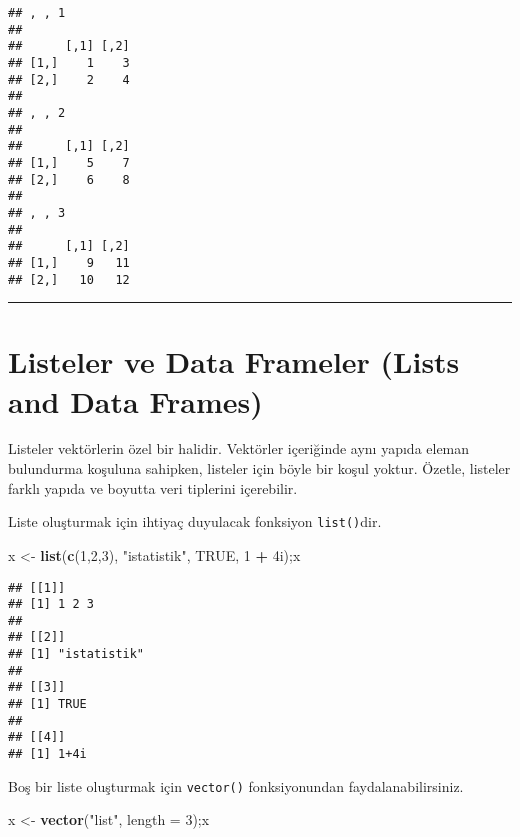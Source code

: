 \documentclass[
]{book}
\newenvironment{Shaded}{\begin{snugshade}}{\end{snugshade}}
\newcommand{\DataTypeTok}[1]{\textcolor[rgb]{0.13,0.29,0.53}{#1}}
\newcommand{\DecValTok}[1]{\textcolor[rgb]{0.00,0.00,0.81}{#1}}
\newcommand{\KeywordTok}[1]{\textcolor[rgb]{0.13,0.29,0.53}{\textbf{#1}}}
\newcommand{\NormalTok}[1]{#1}
\newcommand{\OperatorTok}[1]{\textcolor[rgb]{0.81,0.36,0.00}{\textbf{#1}}}
\newcommand{\OtherTok}[1]{\textcolor[rgb]{0.56,0.35,0.01}{#1}}
\newcommand{\StringTok}[1]{\textcolor[rgb]{0.31,0.60,0.02}{#1}}
\begin{document}
\begin{verbatim}
## , , 1
##
##      [,1] [,2]
## [1,]    1    3
## [2,]    2    4
##
## , , 2
##
##      [,1] [,2]
## [1,]    5    7
## [2,]    6    8
##
## , , 3
##
##      [,1] [,2]
## [1,]    9   11
## [2,]   10   12
\end{verbatim}

\begin{center}\rule{0.5\linewidth}{0.5pt}\end{center}

\hypertarget{listeler-ve-data-frameler-lists-and-data-frames}{%
\section{Listeler ve Data Frameler (Lists and Data Frames)}\label{listeler-ve-data-frameler-lists-and-data-frames}}

Listeler vektörlerin özel bir halidir. Vektörler içeriğinde aynı yapıda eleman bulundurma koşuluna sahipken, listeler için böyle bir koşul yoktur. Özetle, listeler farklı yapıda ve boyutta veri tiplerini içerebilir.

Liste oluşturmak için ihtiyaç duyulacak fonksiyon \texttt{list()}dir.

\begin{Shaded}
\begin{Highlighting}[]
\NormalTok{x <-}\StringTok{ }\KeywordTok{list}\NormalTok{(}\KeywordTok{c}\NormalTok{(}\DecValTok{1}\NormalTok{,}\DecValTok{2}\NormalTok{,}\DecValTok{3}\NormalTok{), }\StringTok{"istatistik"}\NormalTok{, }\OtherTok{TRUE}\NormalTok{, }\DecValTok{1} \OperatorTok{+}\StringTok{ }\NormalTok{4i);x}
\end{Highlighting}
\end{Shaded}

\begin{verbatim}
## [[1]]
## [1] 1 2 3
##
## [[2]]
## [1] "istatistik"
##
## [[3]]
## [1] TRUE
##
## [[4]]
## [1] 1+4i
\end{verbatim}

Boş bir liste oluşturmak için \texttt{vector()} fonksiyonundan faydalanabilirsiniz.

\begin{Shaded}
\begin{Highlighting}[]
\NormalTok{x <-}\StringTok{ }\KeywordTok{vector}\NormalTok{(}\StringTok{"list"}\NormalTok{, }\DataTypeTok{length =} \DecValTok{3}\NormalTok{);x}
\end{Highlighting}
\end{Shaded}
\end{document}
